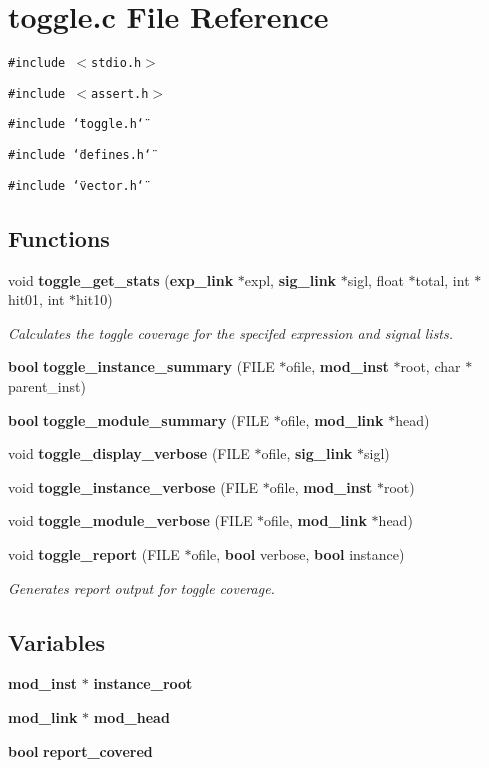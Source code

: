 \section{toggle.c File Reference}
\label{toggle_8c}
{\tt \#include $<$stdio.h$>$}\par
{\tt \#include $<$assert.h$>$}\par
{\tt \#include \char`\"{}toggle.h\char`\"{}}\par
{\tt \#include \char`\"{}defines.h\char`\"{}}\par
{\tt \#include \char`\"{}vector.h\char`\"{}}\par
\subsection*{Functions}
\begin{CompactItemize}
\item 
void {\bf toggle\_\-get\_\-stats} ({\bf exp\_\-link} $\ast$expl, {\bf sig\_\-link} $\ast$sigl, float $\ast$total, int $\ast$hit01, int $\ast$hit10)
\begin{CompactList}\small\item\em Calculates the toggle coverage for the specifed expression and signal lists.\item\end{CompactList}\item 
{\bf bool} {\bf toggle\_\-instance\_\-summary} (FILE $\ast$ofile, {\bf mod\_\-inst} $\ast$root, char $\ast$parent\_\-inst)
\item 
{\bf bool} {\bf toggle\_\-module\_\-summary} (FILE $\ast$ofile, {\bf mod\_\-link} $\ast$head)
\item 
void {\bf toggle\_\-display\_\-verbose} (FILE $\ast$ofile, {\bf sig\_\-link} $\ast$sigl)
\item 
void {\bf toggle\_\-instance\_\-verbose} (FILE $\ast$ofile, {\bf mod\_\-inst} $\ast$root)
\item 
void {\bf toggle\_\-module\_\-verbose} (FILE $\ast$ofile, {\bf mod\_\-link} $\ast$head)
\item 
void {\bf toggle\_\-report} (FILE $\ast$ofile, {\bf bool} verbose, {\bf bool} instance)
\begin{CompactList}\small\item\em Generates report output for toggle coverage.\item\end{CompactList}\end{CompactItemize}
\subsection*{Variables}
\begin{CompactItemize}
\item 
{\bf mod\_\-inst} $\ast$ {\bf instance\_\-root}
\item 
{\bf mod\_\-link} $\ast$ {\bf mod\_\-head}
\item 
{\bf bool} {\bf report\_\-covered}
\end{CompactItemize}


